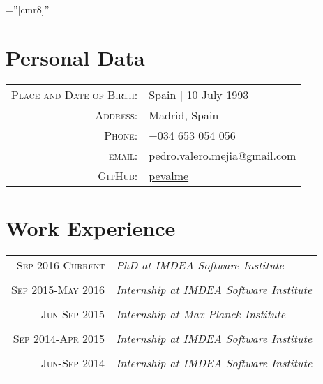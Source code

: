 \documentclass[a4paper,10pt]{article} %
\begin{document}
\pagestyle{empty} %

\font\fb=''[cmr8]'' %


\par{\bigskip\par} %

\section{Personal Data}

\begin{tabular}{rl}
\textsc{Place and Date of Birth:} & Spain  | 10 July 1993 \\
\textsc{Address:} & Madrid, Spain \\
\textsc{Phone:} & +034 653 054 056\\
\textsc{email:} & \href{mailto:pedro.valero.mejia@gmail.com}{pedro.valero.mejia@gmail.com} \\
\textsc{GitHub:} & \href{https://github.com/pevalme}{pevalme}
\end{tabular}


\section{Work Experience}

\begin{tabular}{r|p{11cm}}
\textsc{Sep 2016-Current} & \emph{PhD at IMDEA Software Institute}\\
\multicolumn{2}{c}{} \\

\textsc{Sep 2015-May 2016} & \emph{Internship at IMDEA Software Institute}\\
\multicolumn{2}{c}{} \\

\textsc{Jun-Sep 2015} & \emph{Internship at Max Planck Institute}\\
\multicolumn{2}{c}{} \\

\textsc{Sep 2014-Apr 2015} & \emph{Internship at IMDEA Software Institute}\\
\multicolumn{2}{c}{} \\

\textsc{Jun-Sep 2014} & \emph{Internship at IMDEA Software Institute}\\
\multicolumn{2}{c}{} \\
\end{tabular}
\end{document}
